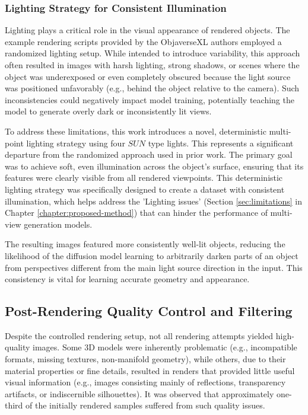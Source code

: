 \subsubsection{Lighting Strategy for Consistent Illumination}\label{sssec:lighting-strategy}
Lighting plays a critical role in the visual appearance of rendered objects. The example rendering scripts provided by the ObjaverseXL authors \cite{objaverse} employed a randomized lighting setup. While intended to introduce variability, this approach often resulted in images with harsh lighting, strong shadows, or scenes where the object was underexposed or even completely obscured because the light source was positioned unfavorably (e.g., behind the object relative to the camera). Such inconsistencies could negatively impact model training, potentially teaching the model to generate overly dark or inconsistently lit views.

To address these limitations, this work introduces a novel, deterministic multi-point lighting strategy using four $SUN$ type lights. This represents a significant departure from the randomized approach used in prior work. The primary goal was to achieve soft, even illumination across the object's surface, ensuring that its features were clearly visible from all rendered viewpoints. This deterministic lighting strategy was specifically designed to create a dataset with consistent illumination, which helps address the 'Lighting issues' (Section \ref{sec:limitations} in Chapter \ref{chapter:proposed-method}) that can hinder the performance of multi-view generation models.

The resulting images featured more consistently well-lit objects, reducing the likelihood of the diffusion model learning to arbitrarily darken parts of an object from perspectives different from the main light source direction in the input. This consistency is vital for learning accurate geometry and appearance.

\subsection{Post-Rendering Quality Control and Filtering}\label{s sec:quality-control}
Despite the controlled rendering setup, not all rendering attempts yielded high-quality images. Some 3D models were inherently problematic (e.g., incompatible formats, missing textures, non-manifold geometry), while others, due to their material properties or fine details, resulted in renders that provided little useful visual information (e.g., images consisting mainly of reflections, transparency artifacts, or indiscernible silhouettes). It was observed that approximately one-third of the initially rendered samples suffered from such quality issues.


